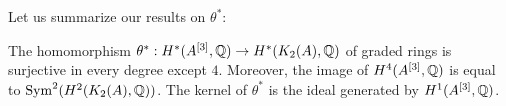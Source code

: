 Let us summarize our results on $\theta^*$:
\begin{theorem}\label{thetaTheorem}
The homomorphism $\theta^* : H^*(A\hilb{3},\Q)\rightarrow H^*(\kum{A}{2},\Q)$ of graded rings is surjective in every degree except $4$. Moreover, the image of $H^4(A\hilb{3},\Q)$ is equal to $\Sym^2(H^2(\kum{A}{2},\Q))$. 
The kernel of $\theta^*$ is the ideal generated by $H^1(A\hilb{3},\Q)$.
\end{theorem}
